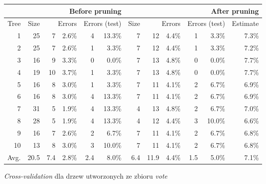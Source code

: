 \documentclass{article}
\begin{document}
\begin{itemize}
\begin{figure}
\begin{tabular}{|r||r|rr|rr||r|rr|rr|r|}
\hline
&\multicolumn{5}{1||}{Before pruning}&\multicolumn{6}{1|}{After pruning} \\
\hline
Tree & 
Size & 
\multicolumn{2}{1|}{Errors} & 
\multicolumn{2}{1||}{Errors (test)} & 
Size & 
\multicolumn{2}{1|}{Errors} & 
\multicolumn{2}{1|}{Errors (test)} & 
Estimate \\
\hline\hline
    1 &   25 &    7 & 2.6\% &    4 & 13.3\% &    7 &   12 & 4.4\% &    1 &  3.3\%  &   7.3\%  \\
    2 &   25 &    7 & 2.6\% &    1 &  3.3\% &    7 &   12 & 4.4\% &    1 &  3.3\%  &   7.2\%  \\
    3 &   16 &    9 & 3.3\% &    0 &  0.0\% &    7 &   13 & 4.8\% &    0 &  0.0\%  &   7.7\%  \\
    4 &   19 &   10 & 3.7\% &    1 &  3.3\% &    7 &   13 & 4.8\% &    0 &  0.0\%  &   7.7\%  \\
    5 &   16 &    8 & 3.0\% &    1 &  3.3\% &    7 &   11 & 4.1\% &    2 &  6.7\%  &   6.9\%  \\
    6 &   16 &    8 & 3.0\% &    4 & 13.3\% &    7 &   11 & 4.1\% &    2 &  6.7\%  &   6.9\%  \\
    7 &   31 &    5 & 1.9\% &    4 & 13.3\% &    4 &   13 & 4.8\% &    2 &  6.7\%  &   7.0\%  \\
    8 &   28 &    5 & 1.9\% &    4 & 13.3\% &    4 &   12 & 4.4\% &    3 & 10.0\%  &   6.6\%  \\
    9 &   16 &    7 & 2.6\% &    2 &  6.7\% &    7 &   11 & 4.1\% &    2 &  6.7\%  &   6.8\%  \\
   10 &   13 &    8 & 3.0\% &    3 & 10.0\% &    7 &   11 & 4.1\% &    2 &  6.7\%  &   6.8\%  \\
\hline\hline
 Avg. & 20.5 &  7.4 & 2.8\% &  2.4 & 8.0\%  &  6.4 & 11.9 & 4.4\% &  1.5 &  5.0\%  &   7.1\%  \\
\hline
\end{tabular}
\caption{\emph{Cross-validation} dla drzew utworzonych ze zbioru \emph{vote}}
\label{p2t2-vote-trees-cv}
\end{figure}


\end{itemize}
\end{document}
